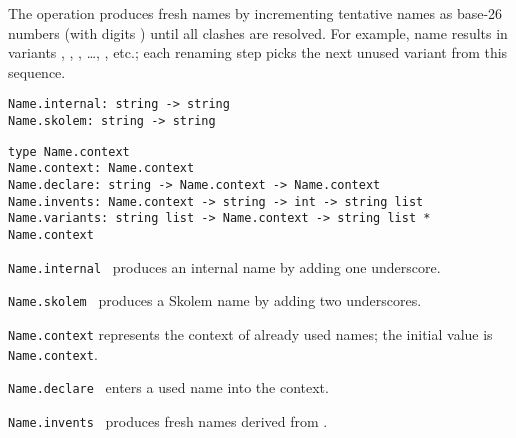 \begin{isabellebody}
\begin{isamarkuptext}
  The  operation produces fresh names by
  incrementing tentative names as base-26 numbers (with digits ) until all clashes are resolved.  For example, name  results in variants , , , \dots, ,  etc.; each renaming
  step picks the next unused variant from this sequence.%
\end{isamarkuptext}%
\isamarkuptrue%
%
\isadelimmlref
%
\endisadelimmlref
%
\isatagmlref
%
\begin{isamarkuptext}%
\begin{mldecls}
  \verb|Name.internal: string -> string| \\
  \verb|Name.skolem: string -> string| \\
  \end{mldecls}
  \begin{mldecls}
  \verb|type Name.context| \\
  \verb|Name.context: Name.context| \\
  \verb|Name.declare: string -> Name.context -> Name.context| \\
  \verb|Name.invents: Name.context -> string -> int -> string list| \\
  \verb|Name.variants: string list -> Name.context -> string list * Name.context| \\
  \end{mldecls}

  \begin{description}

  \item \verb|Name.internal|~ produces an internal name
  by adding one underscore.

  \item \verb|Name.skolem|~ produces a Skolem name by
  adding two underscores.

  \item \verb|Name.context| represents the context of already used
  names; the initial value is \verb|Name.context|.

  \item \verb|Name.declare|~ enters a used name into the
  context.

  \item \verb|Name.invents|~ produces  fresh names derived from .


\end{description}
\end{isamarkuptext}
\end{isabellebody}
